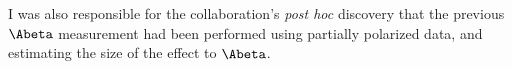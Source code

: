 I was also responsible for the collaboration's \emph{post hoc} discovery that the previous $\Abeta$ measurement had been performed using partially polarized data, and estimating the size of the effect to $\Abeta$.



